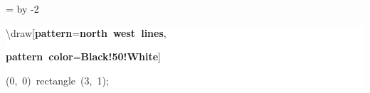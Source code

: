 \begingroup
\ttfamily
{}
=\textwidth
\advance{} by -2\fboxsep
\noindent
\colorbox{background}
{%
\parbox{\dimen255}
{%
\rule[-0.5ex]{0pt}{2.5ex}\hspace*{0.0em}\textbackslash{}draw[\textcolor{R}{\textbf{pattern}}=\textcolor{B}{\textbf{north~west~lines}},\\
\rule[-0.5ex]{0pt}{2.5ex}\hspace*{3.0em}\textcolor{R}{\textbf{pattern~color}}=\textcolor{B}{\textbf{Black!50!White}}]\\
\rule[-0.5ex]{0pt}{2.5ex}\hspace*{3.0em}(0,~0)~rectangle~(3,~1);}%
}%
\endgroup
